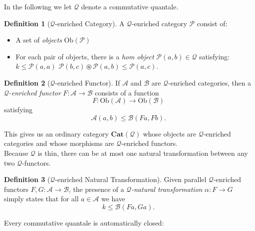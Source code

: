\documentclass[12pt]{article}
\theoremstyle{definition}
\newtheorem{definition}{Definition}[section]
\theoremstyle{plain}
\theoremstyle{plain}
\theoremstyle{plain}
\theoremstyle{plain}
\theoremstyle{remark}
\theoremstyle{remark}
\newcommand{\mc}[1]{\mathcal{#1}}
\begin{document}
In the following we let $\mc{Q}$ denote a commutative quantale.

\begin{definition}[$\mc{Q}$-enriched Category]
	A $\mc{Q}$-enriched category $\mc{P}$ consist of:
	\begin{itemize}
		\item A set of \emph{objects} $\text{Ob}(\mc{P})$
		\item For each pair of objects, there is a \emph{hom object} $\mc{P}(a,b) \in \mc{Q}$ satisfying:
			 $k \leq \mc{P}(a,a)$
			 $\mc{P}(b,c) \circledast \mc{P}(a,b) \leq \mc{P}(a,c).$
	\end{itemize}
\end{definition}

\begin{definition}[$\mc{Q}$-enriched Functor]
	If $\mc{A}$ and $\mc{B}$ are $\mc{Q}$-enriched categories, then a \emph{$\mc{Q}$-enriched functor} $F: \mc{A} \rightarrow \mc{B}$ consists of a function $$F: \text{Ob}(\mc{A}) \rightarrow \text{Ob}(\mc{B}) $$ satisfying $$ \mc{A}(a,b) \leq \mc{B}(Fa,Fb) .$$
\end{definition}

This gives us an ordinary category $\mathbf{Cat}(\mc{Q})$ whose objects are $\mc{Q}$-enriched categories and whose morphisms are $\mc{Q}$-enriched functors. \\

Because $\mc{Q}$ is thin, there can be at most one natural transformation between any two $\mc{Q}$-functors.

\begin{definition}[$\mc{Q}$-enriched Natural Transformation]
	Given parallel $\mc{Q}$-enriched functors $F,G: \mc{A} \rightarrow \mc{B}$, the presence of a \emph{$\mc{Q}$-natural transformation} $\alpha: F \rightarrow G$ simply states that for all $a \in \mc{A}$ we have
	$$
	k \leq \mc{B}(Fa,Ga).
	$$
\end{definition}

Every commutative quantale is automatically closed:
\end{document}
